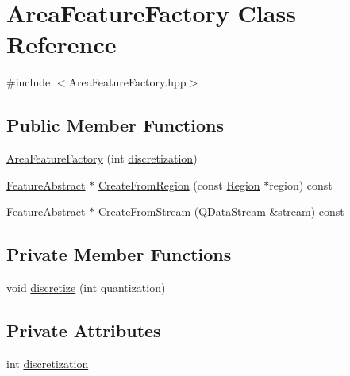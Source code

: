 \hypertarget{class_area_feature_factory}{\section{Area\+Feature\+Factory Class Reference}
\label{class_area_feature_factory}
}


{\ttfamily \#include $<$Area\+Feature\+Factory.\+hpp$>$}

\subsection*{Public Member Functions}
\begin{DoxyCompactItemize}
\item 
\hyperlink{class_area_feature_factory_a1299cd28490bc46f5ee66e16b712e37d}{Area\+Feature\+Factory} (int \hyperlink{class_area_feature_factory_a77f36879829aeb6c25e7da509649b1ef}{discretization})
\item 
\hyperlink{class_feature_abstract}{Feature\+Abstract} $\ast$ \hyperlink{class_area_feature_factory_a33051f7cf7d2e89a0e50c63dff2e26c6}{Create\+From\+Region} (const \hyperlink{class_region}{Region} $\ast$region) const 
\item 
\hyperlink{class_feature_abstract}{Feature\+Abstract} $\ast$ \hyperlink{class_area_feature_factory_a80529ff42d772a30fbcc930bd203b03d}{Create\+From\+Stream} (Q\+Data\+Stream \&stream) const 
\end{DoxyCompactItemize}
\subsection*{Private Member Functions}
\begin{DoxyCompactItemize}
\item 
void \hyperlink{class_area_feature_factory_a9e08ded8fb8dcf407edd0d7ec328129b}{discretize} (int quantization)
\end{DoxyCompactItemize}
\subsection*{Private Attributes}
\begin{DoxyCompactItemize}
\item 
int \hyperlink{class_area_feature_factory_a77f36879829aeb6c25e7da509649b1ef}{discretization}
\end{DoxyCompactItemize}


